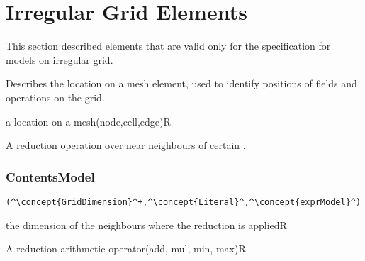 \section{Irregular Grid Elements}
This section described elements that are valid only for
the specification for models on irregular grid.

Describes the location on a mesh element, 
used to identify positions of fields and operations on 
the grid.

\begin{HIRAttributesVal}
	{a location on a mesh}{(node,cell,edge)}{R}
\end{HIRAttributesVal}

A reduction operation over near neighbours of certain  .

\subsubsection*{ContentsModel}{}

\begin{lstlisting}[style=default,frame=none]
(^\concept{GridDimension}^+,^\concept{Literal}^,^\concept{exprModel}^)
\end{lstlisting}

\begin{HIRChildElements} 
	{the dimension of the neighbours where the reduction is applied}{R}
\end{HIRChildElements}

\begin{HIRAttributesVal}
	{A reduction arithmetic operator}{(add, mul, min, max)}{R}
\end{HIRAttributesVal}
